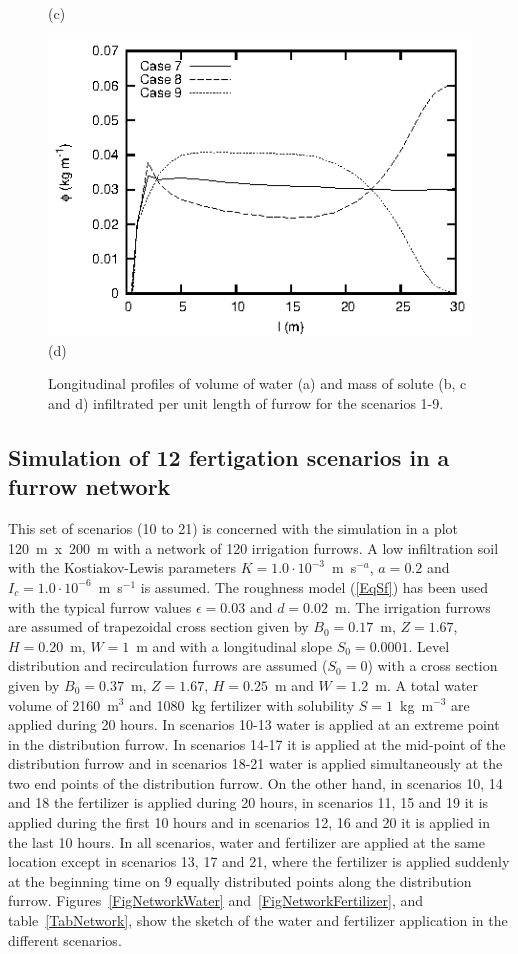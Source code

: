 \documentclass[review,authoryear]{elsarticle}
\begin{document}
\begin{figure}[ht!]
\begin{minipage}{0.49\textwidth}
(c)
\end{minipage}
\begin{minipage}{0.49\textwidth}
\centering
\includegraphics{fertilizer789.eps}
(d)
\end{minipage}
\caption{Longitudinal profiles of volume of water (a) and mass of solute
(b, c and d) infiltrated per unit length of furrow for the scenarios 1-9.}
\label{FigCases}
\end{figure}

\subsection{Simulation of 12 fertigation scenarios in a furrow network}

This set of scenarios (10 to 21) is concerned with the simulation in a plot
120~m~x~200~m with a network of 120 irrigation furrows. A low infiltration soil
with the Kostiakov-Lewis parameters $K=1.0\cdot10^{-3}$~m~s$^{-a}$,
$a=0.2$ and $I_c=1.0\cdot10^{-6}$~m~s$^{-1}$ is assumed. The roughness model (\ref{EqSf})
has been used with the typical  furrow values $\epsilon=0.03$ and $d=0.02$~m.
The irrigation furrows are assumed of trapezoidal cross section given by 
$B_0=0.17$~m, $Z=1.67$, $H=0.20$~m, $W=1$~m and with a longitudinal slope $S_0=0.0001$.
Level distribution and recirculation furrows are assumed ($S_0=0$) with a
cross section given by $B_0=0.37$~m, $Z=1.67$, $H=0.25$~m and $W=1.2$~m. A total
water volume of 2160~m$^3$ and 1080~kg fertilizer with solubility
$S=1$~kg~m$^{-3}$ are applied during 20 hours. In scenarios 10-13 water is applied at
an extreme point in the distribution furrow. In scenarios 14-17 it is applied at
the mid-point of the distribution furrow and in scenarios 18-21 water is applied
simultaneously at the two end points of the distribution furrow. On the other
hand, in scenarios 10, 14 and 18 the fertilizer is applied during 20 hours, in
scenarios
11, 15 and 19 it is applied during the first 10 hours and in scenarios 12, 16 and
20 it is applied in the last 10 hours. In all scenarios, water and fertilizer
are applied at the same location except in scenarios 13, 17 and 21, where the
fertilizer is applied suddenly at the beginning time on 9 equally distributed
points along the distribution furrow. Figures~\ref{FigNetworkWater}
and~\ref{FigNetworkFertilizer}, and table~\ref{TabNetwork}, show the sketch of
the water and fertilizer application in the different scenarios.
\end{document}
